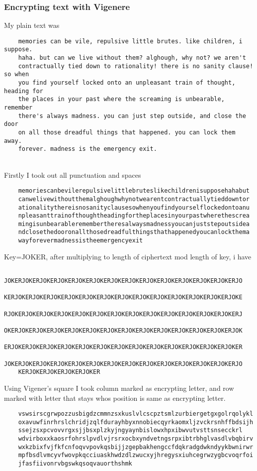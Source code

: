 \documentclass[10pt]{article}
\begin{document}
  \subsubsection{Encrypting text with Vigenere}
  My plain text was 
  \begin{verbatim}
  	memories can be vile, repulsive little brutes. like children, i suppose.
  	haha. but can we live without them? alghough, why not? we aren't 
  	contractually tied down to rationality! there is no sanity clause! so when
  	you find yourself locked onto an unpleasant train of thought, heading for
  	the places in your past where the screaming is unbearable, remember
  	there's always madness. you can just step outside, and close the door
  	on all those dreadful things that happened. you can lock them away.
  	forever. madness is the emergency exit.
  \end{verbatim} \\
  Firstly I took out all punctuation and spaces \\
  \begin{verbatim}
  	memoriescanbevilerepulsivelittlebruteslikechildrenisupposehahabut
  	canwelivewithoutthemalghoughwhynotwearentcontractuallytieddowntor
  	ationalitythereisnosanityclausesowhenyoufindyourselflockedontoanu
  	npleasanttrainofthoughtheadingfortheplacesinyourpastwherethescrea
  	mingisunbearableremembertheresalwaysmadnessyoucanjuststepoutsidea
  	ndclosethedooronallthosedreadfulthingsthathappenedyoucanlockthema
  	wayforevermadnessistheemergencyexit
  \end{verbatim}
  Key=JOKER, after multiplying to length of ciphertext mod length of key, i have
  \begin{verbatim}
  	JOKERJOKERJOKERJOKERJOKERJOKERJOKERJOKERJOKERJOKERJOKERJOKERJOKERJO
  	KERJOKERJOKERJOKERJOKERJOKERJOKERJOKERJOKERJOKERJOKERJOKERJOKERJOKE
  	RJOKERJOKERJOKERJOKERJOKERJOKERJOKERJOKERJOKERJOKERJOKERJOKERJOKERJ
  	OKERJOKERJOKERJOKERJOKERJOKERJOKERJOKERJOKERJOKERJOKERJOKERJOKERJOK
  	ERJOKERJOKERJOKERJOKERJOKERJOKERJOKERJOKERJOKERJOKERJOKERJOKERJOKER
  	JOKERJOKERJOKERJOKERJOKERJOKERJOKERJOKERJOKERJOKERJOKERJOKERJOKERJO
  	KERJOKERJOKERJOKERJOKER
  \end{verbatim}

  Using Vigener's square I took column marked as encrypting letter, and row marked with letter that stays whos position is same as encrypting letter.

  \begin{verbatim}
  	vswsirscgrwpozzusbigdzcmmnzsxkuslvlcscpztsmlzurbiergetgxgolrqolykl
  	oxavuwfinrhrslchridjzqlfdurayhbyxnnobiecqyrkaomxljzvckrsnhffbdsijh
  	ssejzsxpcvovvrgxsjjbsxplzkyjngyaynbislowxhpxibwvutvsttsnsecckrl
  	wdvirboxxkaosrfohrslpvdlvjrsrxocbxyndvetngsrpxibtrbhglvasdlvbqbirv
  	wxkzbixfvjfkfcnfoqvvpovkqsbijjzgepbakhengccfdqkradgdwkndyykbwnirwr
  	mpfbsdlvmcyvfwovpkqcciuaskhwdzdlzwucxyjhregysxiuhcegrwzygbcvoqrfoi
  	jfasfiivonrvbgswkqsoqvauorthshmk
  \end{verbatim}
\end{document}
